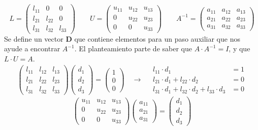 \documentclass[12pt, notitlepage]{article}
\begin{document}
\begin{equation*}
L = \begin{pmatrix}
l_{11} & 0 & 0 \\
l_{21} & l_{22} & 0 \\
l_{31} & l_{32} & l_{33}
\end{pmatrix} \qquad U=\begin{pmatrix}
u_{11} & u_{12} & u_{13} \\
0 & u_{22} & u_{23} \\
0 & 0 & u_{33}
\end{pmatrix} \qquad A^{-1} = \begin{pmatrix}
a_{11} & a_{12} & a_{13} \\
a_{21} & a_{22} & a_{23} \\
a_{31} & a_{32} & a_{33}
\end{pmatrix}
\end{equation*}
Se define un vector \textbf{D} que contiene elementos para un paso auxiliar que nos ayude a encontrar $A^{-1}$. El planteamiento parte de saber que $A\cdot A^{-1}=I$, y que $L\cdot U = A$.
\begin{gather}
\begin{pmatrix}
l_{11} & l_{12} & l_{13} \\
l_{21} & l_{22} & l_{23} \\
l_{31} & l_{32} & l_{33}
\end{pmatrix} \begin{pmatrix}
d_1 \\ d_2 \\ d_3
\end{pmatrix} = \begin{pmatrix}
1\\0\\0
\end{pmatrix} \quad \rightarrow \quad
\begin{matrix}
l_{11}\cdot d_1 & = 1\\
l_{21}\cdot d_1+ l_{22}\cdot d_2  & = 0 \\
l_{31}\cdot d_1+ l_{32}\cdot d_2 + l_{33}\cdot d_3 & = 0
\end{matrix}
\end{gather}
\begin{equation}
\begin{pmatrix}
u_{11} & u_{12} & u_{13}\\
0 & u_{22} & u_{23}\\
0 & 0 & u_{33}
\end{pmatrix} \begin{pmatrix}
a_{11} \\ a_{21} \\ a_{31}
\end{pmatrix} = \begin{pmatrix}
d_1 \\ d_2 \\ d_3
\end{pmatrix}
\end{equation}
\end{document}
